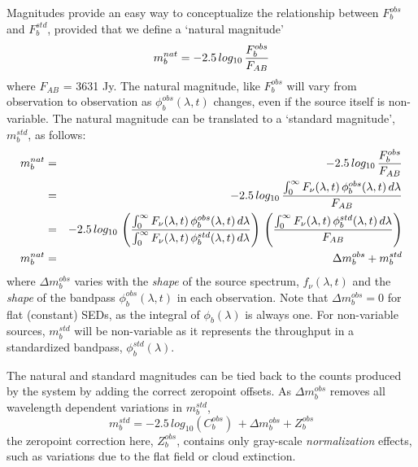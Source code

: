\documentclass[12pt,preprint]{aastex}
\begin{document}
Magnitudes provide an easy way to conceptualize the relationship
between $F_b^{obs}$ and $F_b^{std}$, provided that we define a
`natural magnitude' 
\begin{equation}
\label{eqn:natmag}
m_b^{nat}  = -2.5\, log_{10} \, {F_b^{obs} \over F_{AB}} 
\end{equation}
where $F_{AB}$ = 3631 Jy. The natural magnitude, like $F_b^{obs}$ will
vary from observation to observation as $\phi_b^{obs}(\lambda,t)$
changes, even if the source itself is non-variable. The natural
magnitude can be translated to a `standard magnitude', $m_b^{std}$, as
follows:
\begin{eqnarray}
m_b^{nat} & = &-2.5\, log_{10} \, {F_b^{obs} \over F_{AB}}  \\
& = & -2.5 \, log_{10} \, { \int_0^\infty {F_\nu(\lambda,t) \,
    \phi_b^{obs}(\lambda,t) \, d\lambda} \over F_{AB} }  \\
& = & -2.5 \, log_{10} \, \left( { \int_0^\infty {F_\nu(\lambda,t) \,
    \phi_b^{obs}(\lambda,t) \, d\lambda} \over \int_0^\infty {F_\nu(\lambda,t) \,
    \phi_b^{std}(\lambda,t) \, d\lambda}} \right) \, \left( {\int_0^\infty {F_\nu(\lambda,t) \,
    \phi_b^{std}(\lambda,t) \, d\lambda} \over F_{AB}} \right) \\
m_b^{nat} & = & \Delta m_b^{obs} + m_b^{std} 
\end{eqnarray}
where $\Delta m_b^{obs}$ varies with the {\it shape} of the source
spectrum, $f_\nu(\lambda,t)$ and the {\it shape} of the bandpass
$\phi_b^{obs}(\lambda,t)$ in each observation. Note that $\Delta
m_b^{obs}=0$ for flat (constant) SEDs, as the integral of
$\phi_b(\lambda)$ is always one.  For non-variable sources,
$m_b^{std}$ will be non-variable as it represents the throughput in a
standardized bandpass, $\phi_b^{std}(\lambda)$.

The natural and standard magnitudes can be tied back to the counts
produced by the system by adding the correct zeropoint offsets. As
$\Delta m_b^{obs}$ removes all wavelength dependent variations in $m_b^{std}$,
\begin{equation}
\label{eqn:mag2counts}
m_b^{std} = -2.5\,log_{10}(C_b^{obs}) \, + \Delta m_b^{obs} + Z_b^{obs}
\end{equation}
the zeropoint correction here, $Z_b^{obs}$, contains only gray-scale
{\it normalization} effects, such as variations due to the flat field
or cloud extinction. 
\end{document}
